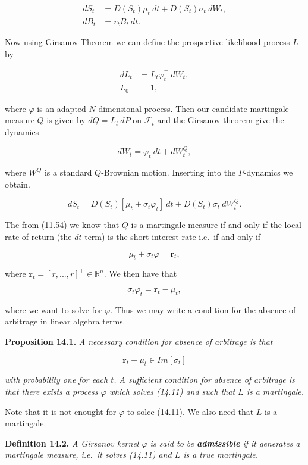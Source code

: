 \documentclass[
]{article}
\begin{document}
\begin{align*}
dS_t&= D(S_t)\mu_t\ dt+D(S_t)\sigma_t\ dW_t,\tag{14.3}\\
dB_t&=r_tB_t\ dt.\tag{14.4}
\end{align*}

Now using Girsanov Theorem we can define the prospective likelihood
process \(L\) by

\begin{align*}
dL_t&=L_t\varphi_t^\top\ dW_t,\tag{14.5}\\
L_0&=1,\tag{14.6}
\end{align*}

where \(\varphi\) is an adapted \(N\)-dimensional process. Then our
candidate martingale measure \(Q\) is given by \(dQ=L_t\ dP\) on
\(\mathcal{F}_t\) and the Girsanov theorem give the dynamics

\[
dW_t=\varphi_t\ dt+dW_t^Q,\tag{14.7}
\]

where \(W^Q\) is a standard \(Q\)-Brownian motion. Inserting into the
\(P\)-dynamics we obtain.

\[
dS_t=D(S_t)[\mu_t+\sigma_t\varphi_t]\ dt+D(S_t)\sigma_t\ dW_t^Q.\tag{14.8}
\]

The from (11.54) we know that \(Q\) is a martingale measure if and only
if the local rate of return (the \(dt\)-term) is the short interest rate
i.e.~if and only if

\[
\mu_t+\sigma_t\varphi=\mathbf{r}_t,\tag{14.9}
\]

where \(\mathbf{r}_t=[r,...,r]^\top\in\mathbb{R}^n\). We then have that

\[
\sigma_t\varphi_t = \mathbf{r}_t-\mu_t,\tag{14.11}
\]

where we want to solve for \(\varphi\). Thus we may write a condition
for the absence of arbitrage in linear algebra terms.

\textbf{Proposition 14.1.} \emph{A necessary condition for absence of
arbitrage is that}

\[
\mathbf{r}_t-\mu_t\in Im[\sigma_t]
\]

\emph{with probability one for each \(t\). A sufficient condition for
absence of arbitrage is that there exists a process \(\varphi\) which
solves (14.11) and such that \(L\) is a martingale.}

Note that it is not enought for \(\varphi\) to solce (14.11). We also
need that \(L\) is a martingale.

\textbf{Definition 14.2.} \emph{A Girsanov kernel \(\varphi\) is said to
be \textbf{admissible} if it generates a martingale measure, i.e.~it
solves (14.11) and \(L\) is a true martingale.}
\end{document}
